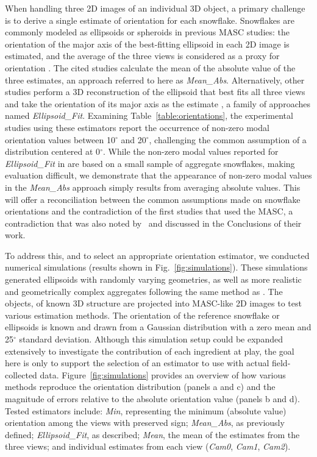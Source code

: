 \documentclass[draft]{agujournal2019}
\begin{document}
When handling three 2D images of an individual 3D object, a primary challenge is to derive a single  estimate of orientation for each snowflake. Snowflakes are commonly modeled as ellipsoids or spheroids in previous MASC studies: the orientation of the major axis of the best-fitting ellipsoid in each 2D image is estimated, and the average of the three views is considered as a proxy for orientation \cite{Garrett_GRL_2015, Gergely_JGRA_2016, Fitch_AMT_2021, Fitch_JGR_2022}. The cited studies calculate the mean of the absolute value of the three estimates, an approach referred to here as \textit{Mean\_Abs}. Alternatively, other studies perform a 3D reconstruction of the ellipsoid that best fits all three views and take the orientation of its major axis as the estimate \cite{Jiang_JAS_2019}, a family of approaches named \textit{Ellipsoid\_Fit}. Examining Table~\ref{table:orientations}, the experimental studies using these estimators report the occurrence of non-zero modal orientation values between 10$^\circ$ and 20$^\circ$, challenging the common assumption of a distribution centered at 0$^\circ$. While the non-zero modal values reported for \textit{Ellipsoid\_Fit} in \cite{Jiang_JAS_2019} are based on a small sample of aggregate snowflakes, making evaluation difficult, we demonstrate that the appearance of non-zero modal values in the \textit{Mean\_Abs} approach simply results from averaging absolute values. This will offer a reconciliation between the common assumptions made on snowflake orientations and the contradiction of the first studies that used the MASC, a contradiction that was also noted by~ and discussed in the Conclusions of their work. 

To address this, and to select an appropriate orientation estimator, we conducted numerical simulations (results shown in Fig.~\ref{fig:simulations}). These simulations generated ellipsoids with randomly varying geometries, as well as more realistic and geometrically complex aggregates following the same method as . The objects, of known 3D structure are projected into MASC-like 2D images to test various estimation methods. The orientation of the reference snowflake or ellipsoids is known and drawn from a Gaussian distribution with a zero mean and 25$^\circ$ standard deviation. Although this simulation setup could be expanded extensively to investigate the contribution of each ingredient at play, the goal here is only to support the selection of an estimator to use with actual field-collected data. Figure~\ref{fig:simulations} provides an overview of how various methods reproduce the orientation distribution (panels a and c) and the magnitude of errors relative to the absolute orientation value (panels b and d). Tested estimators include: \textit{Min}, representing the minimum (absolute value) orientation among the views with preserved sign; \textit{Mean\_Abs}, as previously defined; \textit{Ellipsoid\_Fit}, as described; \textit{Mean}, the mean of the estimates from the three views; and individual estimates from each view (\textit{Cam0}, \textit{Cam1}, \textit{Cam2}).
\end{document}
